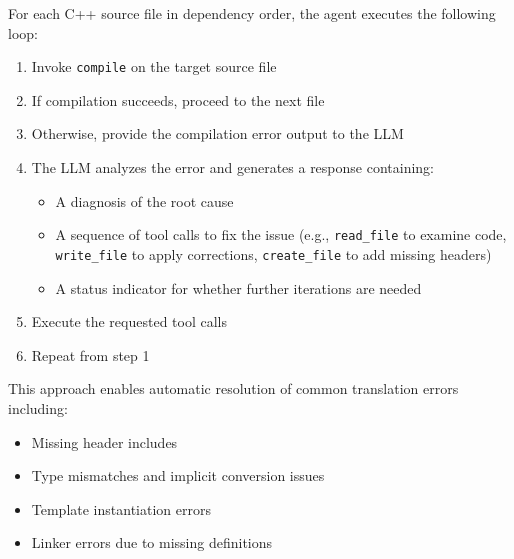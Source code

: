 For each C++ source file in dependency order, the agent executes the following loop:
\begin{enumerate}
\item Invoke \texttt{compile} on the target source file
\item If compilation succeeds, proceed to the next file
\item Otherwise, provide the compilation error output to the LLM
\item The LLM analyzes the error and generates a response containing:
\begin{itemize}
\item A diagnosis of the root cause
\item A sequence of tool calls to fix the issue (e.g., \texttt{read\_file} to examine code, \texttt{write\_file} to apply corrections, \texttt{create\_file} to add missing headers)
\item A status indicator for whether further iterations are needed
\end{itemize}
\item Execute the requested tool calls
\item Repeat from step 1
\end{enumerate}

This approach enables automatic resolution of common translation errors including:
\begin{itemize}
\item Missing header includes
\item Type mismatches and implicit conversion issues
\item Template instantiation errors
\item Linker errors due to missing definitions
\end{itemize}


